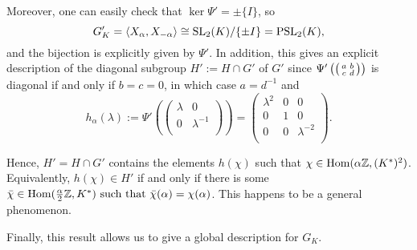 Moreover, one can easily check that $\ker\Psi'=\pm\{I\}$, so
$$G'_K=\langle X_\alpha,X_{-\alpha}\rangle\cong\mathrm{SL}_2(K)/\{\pm I\}=\mathrm{PSL}_2(K),$$
and the bijection is explicitly given by $\Psi'$. In addition, this gives an explicit description of the diagonal subgroup $H':=H\cap G'$ of $G'$ since $\Psi'\left(\begin{psmallmatrix}
    a&b\\
    c&d\\
\end{psmallmatrix}\right)$ is diagonal if and only if $b=c=0$, in which case $a=d^{-1}$ and
$$h_\alpha(\lambda):=\Psi'\left(\begin{pmatrix}
    \lambda & 0\\
    0 & \lambda^{-1}\\
\end{pmatrix}\right)=\begin{pmatrix}
    \lambda^2 & 0 & 0\\
    0 & 1 & 0\\
    0 & 0 & \lambda^{-2}\\
\end{pmatrix}.$$

Hence, $H'=H\cap G'$ contains the elements $h(\chi)$ such that $\chi\in\mathrm{Hom}(\alpha\mathbb{Z},(K^*)^2)$. Equivalently, $h(\chi)\in H'$ if and only if there is some $\bar\chi\in\mathrm{Hom}(\frac{\alpha}{2}\mathbb{Z},K^*)\text{ such that }\bar\chi(\alpha)=\chi(\alpha)$. This happens to be a general phenomenon.

Finally, this result allows us to give a global description for $G_K$.

